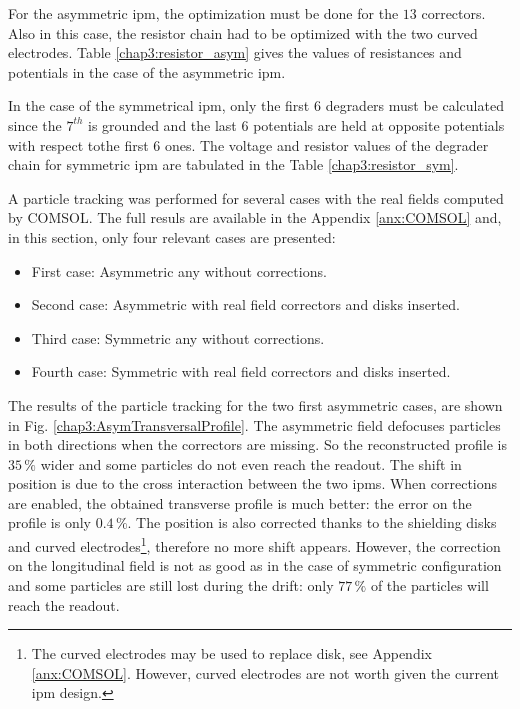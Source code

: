 \begin{refsection}
  For the asymmetric \acrshort{ipm}, the optimization must be done for the $13$ correctors. Also in this case, the resistor chain had to be optimized with the two curved electrodes. Table \ref{chap3:resistor_asym} gives the values of resistances and potentials in the case of the asymmetric \acrshort{ipm}.
  

  In the case of the symmetrical \acrshort{ipm}, only the first $6$ degraders must be calculated since the $7^{th}$ is grounded and the last $6$ potentials are held at opposite potentials with respect tothe first 6 ones. The voltage and resistor values of the degrader chain for symmetric \acrshort{ipm} are tabulated in the Table \ref{chap3:resistor_sym}.
  

  A particle tracking was performed for several cases with the real fields computed by COMSOL. The full resuls are available in the Appendix \ref{anx:COMSOL} and, in this section, only four relevant cases are presented:
  \begin{itemize}
    \item First case: Asymmetric any without corrections.
    \item Second case: Asymmetric with real field correctors and disks inserted.
    \item Third case: Symmetric any without corrections.
    \item Fourth case: Symmetric with real field correctors and disks inserted.
  \end{itemize}

  The results of the particle tracking for the two first asymmetric cases, are shown in Fig. \ref{chap3:AsymTransversalProfile}. The asymmetric field defocuses particles in both directions when the correctors are missing. So the reconstructed profile is $35\,\mathrm{\%}$ wider and some particles do not even reach the readout. The shift in position is due to the cross interaction between the two \acrshort{ipm}s. When corrections are enabled, the obtained transverse profile is much better: the error on the profile is only $0.4\,\mathrm{\%}$. The position is also corrected thanks to the shielding disks and curved electrodes\footnote{The curved electrodes may be used to replace disk, see Appendix \ref{anx:COMSOL}. However, curved electrodes are not worth given the current \acrshort{ipm} design.}, therefore no more shift appears. However, the correction on the longitudinal field is not as good as in the case of symmetric configuration and some particles are still lost during the drift: only $77\,\mathrm{\%}$ of the particles will reach the readout.
  


\end{refsection}

